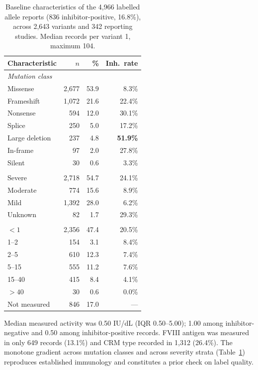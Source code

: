 \documentclass[conference]{IEEEtran}
\begin{document}
\begin{table}[!t]
\caption{Baseline characteristics of the 4,966 labelled allele reports
(836 inhibitor-positive, 16.8\%), across 2,643 variants and 342 reporting
studies. Median records per variant 1, maximum 104.}
\label{tab:cohort}
\centering
\footnotesize
\begin{tabular}{lrrr}
\toprule
Characteristic & $n$ & \% & Inh.\ rate \\
\midrule
\multicolumn{4}{l}{\textit{Mutation class}} \\
Missense              & 2,677 & 53.9 & 8.3\% \\
Frameshift            & 1,072 & 21.6 & 22.4\% \\
Nonsense              & 594   & 12.0 & 30.1\% \\
Splice                & 250   & 5.0  & 17.2\% \\
Large deletion        & 237   & 4.8  & \textbf{51.9\%} \\
In-frame              & 97    & 2.0  & 27.8\% \\
Silent                & 30    & 0.6  & 3.3\% \\
\addlinespace
\multicolumn{4}{l}{\textit{Clinical severity}} \\
Severe                & 2,718 & 54.7 & 24.1\% \\
Moderate              & 774   & 15.6 & 8.9\% \\
Mild                  & 1,392 & 28.0 & 6.2\% \\
Unknown               & 82    & 1.7  & 29.3\% \\
\addlinespace
\multicolumn{4}{l}{\textit{Baseline FVIII activity (IU/dL)}} \\
$<1$                  & 2,356 & 47.4 & 20.5\% \\
1--2                  & 154   & 3.1  & 8.4\% \\
2--5                  & 610   & 12.3 & 7.4\% \\
5--15                 & 555   & 11.2 & 7.6\% \\
15--40                & 415   & 8.4  & 4.1\% \\
$>40$                 & 30    & 0.6  & 0.0\% \\
Not measured          & 846   & 17.0 & --- \\
\bottomrule
\end{tabular}
\end{table}

Median measured activity was 0.50 IU/dL (IQR 0.50--5.00); 1.00 among
inhibitor-negative and 0.50 among inhibitor-positive records. FVIII antigen was
measured in only 649 records (13.1\%) and CRM type recorded in 1{,}312
(26.4\%). The monotone gradient across mutation classes and across severity
strata (Table~\ref{tab:cohort}) reproduces established immunology and
constitutes a prior check on label quality.
\end{document}
